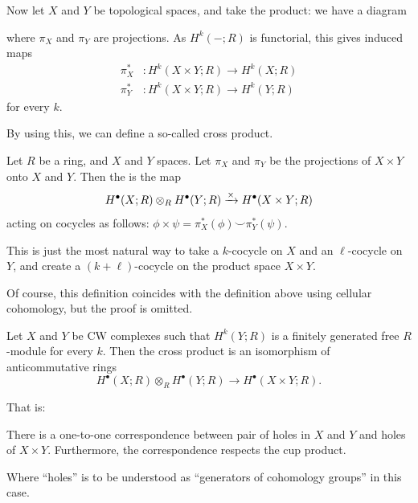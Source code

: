 Now let $X$ and $Y$ be topological spaces, and take the product:
we have a diagram
\begin{center}
\end{center}
where $\pi_X$ and $\pi_Y$ are projections.
As $H^k(-; R)$ is functorial, this gives induced maps
\begin{align*}
	\pi_X^\ast &: H^k(X \times Y; R) \to H^k(X; R) \\
	\pi_Y^\ast &: H^k(X \times Y; R) \to H^k(Y; R)
\end{align*}
for every $k$.

By using this, we can define a so-called cross product.
\begin{definition}
	Let $R$ be a ring, and $X$ and $Y$ spaces.
	Let $\pi_X$ and $\pi_Y$ be the projections of $X \times Y$
	onto $X$ and $Y$.
	Then the  is the map
	\[
		H^\bullet(X; R) \otimes_R H^\bullet(Y;R)
		\xrightarrow{\times} H^\bullet(X \times Y; R)
	\]
	acting on cocycles as follows:
	$\phi \times \psi = \pi_X^\ast(\phi) \smile \pi_Y^\ast(\psi)$.
\end{definition}

This is just the most natural way to take a $k$-cocycle
on $X$ and an $\ell$-cocycle on $Y$, and create a $(k+\ell)$-cocycle
on the product space $X \times Y$.

\begin{remark}
	Of course, this definition coincides with the definition above using cellular cohomology, but
	the proof is omitted.
\end{remark}

\begin{theorem}
	Let $X$ and $Y$ be CW complexes such that $H^k(Y;R)$
	is a finitely generated free $R$-module for every $k$.
	Then the cross product is an isomorphism of anticommutative rings
	\[
		H^\bullet(X;R) \otimes_R H^\bullet(Y;R)
		\to H^\bullet(X \times Y; R).
	\]
\end{theorem}

That is:
\begin{moral}
	There is a one-to-one correspondence between pair of holes in $X$ and $Y$
	and holes of $X \times Y$.
	Furthermore, the correspondence respects the cup product.
\end{moral}
Where ``holes'' is to be understood as ``generators of cohomology groups'' in this case.

